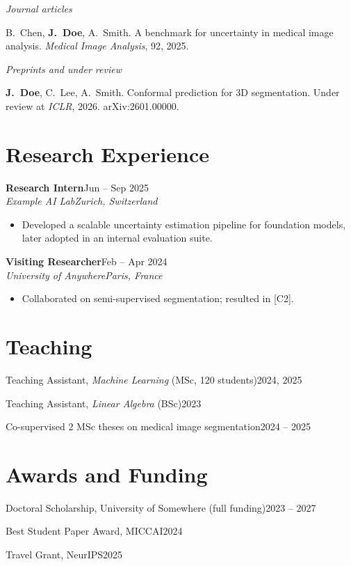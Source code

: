 \documentclass[11pt,a4paper]{article}
\newcommand{\cventry}[4]{%
  \textbf{#1}\hfill #2\\
  \textit{#3}\hfill\textit{#4}\par\smallskip}
\newcommand{\cvline}[2]{#1\hfill #2\par}
\newcommand{\me}{\textbf{J.~Doe}}
\begin{document}
\smallskip
\textit{Journal articles}
\begin{enumerate}[label={[J\arabic*]}, leftmargin=*, noitemsep, topsep=2pt]
  \item B.~Chen, \me, A.~Smith. A benchmark for uncertainty in medical image
        analysis. \textit{Medical Image Analysis}, 92, 2025.
\end{enumerate}

\smallskip
\textit{Preprints and under review}
\begin{enumerate}[label={[P\arabic*]}, leftmargin=*, noitemsep, topsep=2pt]
  \item \me, C.~Lee, A.~Smith. Conformal prediction for 3D segmentation.
        Under review at \textit{ICLR}, 2026. arXiv:2601.00000.
\end{enumerate}

\section{Research Experience}
\cventry{Research Intern}{Jun -- Sep 2025}{Example AI Lab}{Zurich, Switzerland}
\begin{itemize}
  \item Developed a scalable uncertainty estimation pipeline for foundation models,
        later adopted in an internal evaluation suite.
\end{itemize}

\medskip
\cventry{Visiting Researcher}{Feb -- Apr 2024}{University of Anywhere}{Paris, France}
\begin{itemize}
  \item Collaborated on semi-supervised segmentation; resulted in [C2].
\end{itemize}

\section{Teaching}
\cvline{Teaching Assistant, \textit{Machine Learning} (MSc, 120 students)}{2024, 2025}
\cvline{Teaching Assistant, \textit{Linear Algebra} (BSc)}{2023}
\cvline{Co-supervised 2 MSc theses on medical image segmentation}{2024 -- 2025}

\section{Awards and Funding}
\cvline{Doctoral Scholarship, University of Somewhere (full funding)}{2023 -- 2027}
\cvline{Best Student Paper Award, MICCAI}{2024}
\cvline{Travel Grant, NeurIPS}{2025}
\end{document}

